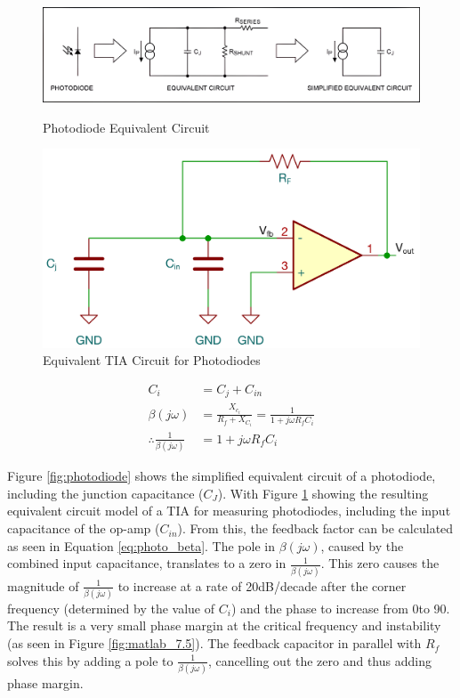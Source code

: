 \begin{figure}[H]
    \centering
    \begin{minipage}{0.6\textwidth}
        \centering
        \includegraphics[width=\textwidth]{PhotoDiodeCircuit.png}
        \caption[Photodiode Equivalent Circuit]{Photodiode Equivalent Circuit\cite{StabilizeYourTransimpedance}}
        \label{fig:photodiode}
    \end{minipage}\hfill
    \begin{minipage}{0.4\textwidth}
        \centering
        \includegraphics[width=\textwidth]{PhotoTIA.png}
        \caption{Equivalent TIA Circuit for Photodiodes}
        \label{fig:tia_photo}
    \end{minipage}
\end{figure}

\begin{align}
    C_i &= C_j+C_{in} \\
    \beta (j\omega) &= \frac{X_{c_i}}{R_f + X_{C_i}} = \frac{1}{1+j\omega R_fC_i} \label{eq:photo_beta}\\
    \therefore \frac{1}{\beta(j\omega)} &= 1+j\omega R_fC_i
\end{align}

Figure \ref{fig:photodiode} shows the simplified equivalent circuit of a photodiode, including the junction capacitance ($C_J$). With Figure \ref{fig:tia_photo} showing the resulting equivalent circuit model of a TIA for measuring photodiodes, including the input capacitance of the op-amp ($C_{in}$). From this, the feedback factor can be calculated as seen in Equation \ref{eq:photo_beta}. The pole in $\beta(j\omega)$, caused by the combined input capacitance, translates to a zero in $\frac{1}{\beta(j\omega)}$. This zero causes the magnitude of $\frac{1}{\beta(j\omega)}$ to increase at a rate of 20dB/decade after the corner frequency (determined by the value of $C_{i}$) and the phase to increase from 0\textdegree to 90\textdegree. The result is a very small phase margin at the critical frequency and instability (as seen in Figure \ref{fig:matlab_7.5}). The feedback capacitor in parallel with $R_f$ solves this by adding a pole to $\frac{1}{\beta(j\omega)}$, cancelling out the zero and thus adding phase margin.

